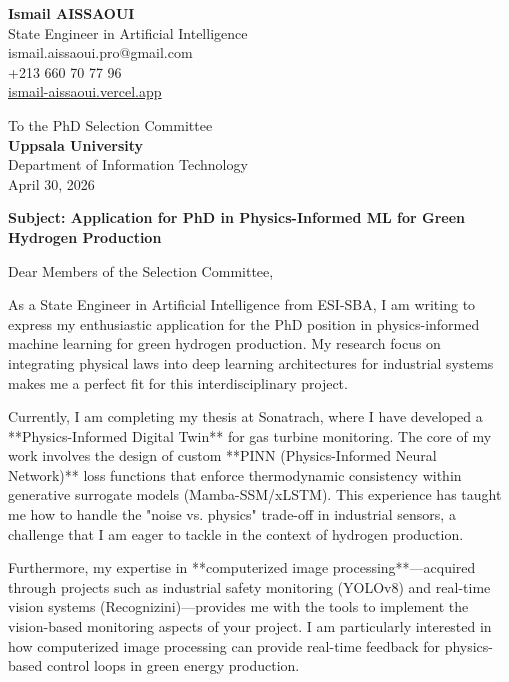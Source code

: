 \documentclass[a4paper,12pt]{article}
\begin{document}
\begin{flushleft}
    \textbf{Ismail AISSAOUI} \\
    State Engineer in Artificial Intelligence \\
    ismail.aissaoui.pro@gmail.com \\
    +213 660 70 77 96 \\
    \href{https://ismail-aissaoui.vercel.app}{ismail-aissaoui.vercel.app}
\end{flushleft}

\begin{flushright}
    To the PhD Selection Committee \\
    \textbf{Uppsala University} \\
    Department of Information Technology \\
    \medskip
    April 30, 2026
\end{flushright}

\bigskip

\noindent \textbf{Subject: Application for PhD in Physics-Informed ML for Green Hydrogen Production}

\bigskip

Dear Members of the Selection Committee,

As a State Engineer in Artificial Intelligence from ESI-SBA, I am writing to express my enthusiastic application for the PhD position in physics-informed machine learning for green hydrogen production. My research focus on integrating physical laws into deep learning architectures for industrial systems makes me a perfect fit for this interdisciplinary project.

Currently, I am completing my thesis at Sonatrach, where I have developed a **Physics-Informed Digital Twin** for gas turbine monitoring. The core of my work involves the design of custom **PINN (Physics-Informed Neural Network)** loss functions that enforce thermodynamic consistency within generative surrogate models (Mamba-SSM/xLSTM). This experience has taught me how to handle the "noise vs. physics" trade-off in industrial sensors, a challenge that I am eager to tackle in the context of hydrogen production.

Furthermore, my expertise in **computerized image processing**—acquired through projects such as industrial safety monitoring (YOLOv8) and real-time vision systems (Recognizini)—provides me with the tools to implement the vision-based monitoring aspects of your project. I am particularly interested in how computerized image processing can provide real-time feedback for physics-based control loops in green energy production.
\end{document}
